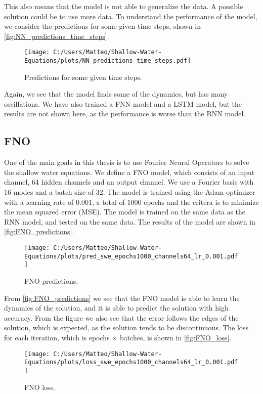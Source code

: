 This also means that the model is not able to generalize the data.
A possible solution could be to use more data.
To understand the performance of the model, we consider the predictions for some given time steps, shown in \autoref{fig:NN_predictions_time_steps}.
\begin{figure}[H]
    \centering
    \texttt{[image: C:/Users/Matteo/Shallow-Water-Equations/plots/NN\_predictions\_time\_steps.pdf]}
    \caption{Predictions for some given time steps.}\label{fig:NN_predictions_time_steps}
\end{figure}
Again, we see that the model finds some of the dynamics, but has many oscillations.
We have also trained a FNN model and a LSTM model, but the results are not shown here, as the performance is worse than the RNN model.


\subsection{FNO}
One of the main goals in this thesis is to use Fourier Neural Operators to solve the shallow water equations.
We define a FNO model, which consists of an input channel, 64 hidden channels and an output channel. We use a Fourier basis with 16 modes and a batch size of 32.
The model is trained using the Adam optimizer with a learning rate of $0.001$, a total of $1000$ epochs and the critera is to minimize the mean squared error (MSE).
The model is trained on the same data as the RNN model, and tested on the same data.
The results of the model are shown in \autoref{fig:FNO_predictions}.
\begin{figure}[H]
    \centering
    \texttt{[image: C:/Users/Matteo/Shallow-Water-Equations/plots/pred\_swe\_epochs1000\_channels64\_lr\_0.001.pdf]}
    \caption{FNO predictions.}\label{fig:FNO_predictions}
\end{figure}
From \autoref{fig:FNO_predictions} we see that the FNO model is able to learn the dynamics of the solution, and it is able to predict the solution with high accuracy.
From the figure we also see that the error follows the edges of the solution, which is expected, as the solution tends to be discontinuous.
The loss for each iteration, which is epochs $\times$ batches, is shown in \autoref{fig:FNO_loss}.
\begin{figure}[H]
    \centering
    \texttt{[image: C:/Users/Matteo/Shallow-Water-Equations/plots/loss\_swe\_epochs1000\_channels64\_lr\_0.001.pdf]}
    \caption{FNO loss.}\label{fig:FNO_loss}
\end{figure}
